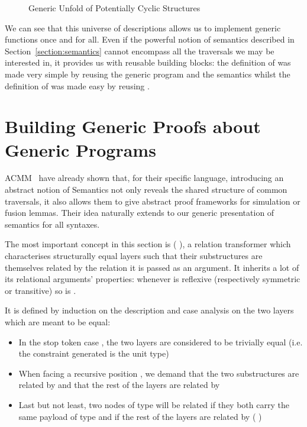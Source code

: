 \begin{figure}[h]
\caption{Generic Unfold of Potentially Cyclic Structures}
\end{figure}

We can see that this universe of descriptions allows us to
implement generic functions once and for all. Even if the
powerful notion of semantics described in Section~\ref{section:semantics}
cannot encompass all the traversals we may be interested in,
it provides us with reusable building blocks: the definition
of  was made very simple by reusing the generic
program  and the  semantics whilst
the definition of  was made easy by reusing .



\section{Building Generic Proofs about Generic Programs}\label{section:simulation}

ACMM~\citeyear{allais2017type} have
already shown that, for their specific language, introducing an abstract
notion of Semantics not only reveals the shared structure of common
traversals, it also allows them to give abstract proof frameworks for
simulation or fusion lemmas. Their idea naturally extends to our generic
presentation of semantics for all syntaxes.

The most important concept in this section is ( ), a relation
transformer which characterises structurally equal layers such that their
substructures are themselves related by the relation it is passed as an
argument. It inherits a lot of its relational arguments' properties: whenever
 is reflexive (respectively symmetric or transitive) so is {  }.\label{lem:zipstable}

It is defined by induction on the description and case analysis on the two
layers which are meant to be equal:
\begin{itemize}
  \item In the stop token case  , the two layers are considered to
    be trivially equal (i.e. the constraint generated is the unit type)
  \item When facing a recursive position { \AB{\Delta}  }, we
    demand that the two substructures are related by { \AB{\Delta} }
    and that the rest of the layers are related by   
  \item Last but not least, two nodes of type {  } will
    be related if they both carry the same payload  of type  and if
    the rest of the layers are related by { ( ) }
\end{itemize}

